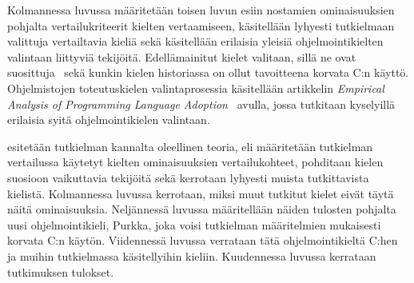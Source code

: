 Kolmannessa luvussa määritetään toisen luvun esiin nostamien ominaisuuksien
pohjalta vertailukriteerit kielten vertaamiseen, käsitellään lyhyesti
tutkielmaan valittuja vertailtavia kieliä sekä käsitellään erilaisia yleisiä
ohjelmointikielten valintaan liittyviä tekijöitä. Edellämainitut kielet
valitaan, sillä ne ovat suosittuja~\citep{tiobe} sekä kunkin kielen historiassa
on ollut tavoitteena korvata C:n käyttö. Ohjelmistojen toteutuskielen
valintaprosessia käsitellään artikkelin \emph{Empirical Analysis of Programming
Language Adoption}~\citep{empiricalpopularity} avulla, jossa tutkitaan
kyselyillä erilaisia syitä ohjelmointikielen valintaan.


esitetään tutkielman kannalta oleellinen
teoria, eli määritetään tutkielman vertailussa käytetyt kielten ominaisuuksien
vertailukohteet, pohditaan kielen suosioon vaikuttavia tekijöitä sekä kerrotaan
lyhyesti muista tutkittavista kielistä. Kolmannessa luvussa kerrotaan, miksi
muut tutkitut kielet eivät täytä näitä ominaisuuksia. Neljännessä luvussa
määritellään näiden tulosten pohjalta uusi ohjelmointikieli, Purkka, joka voisi
tutkielman määritelmien mukaisesti korvata C:n käytön. Viidennessä luvussa
verrataan tätä ohjelmointikieltä C:hen ja muihin tutkielmassa käsitellyihin
kieliin. Kuudennessa luvussa kerrataan tutkimuksen tulokset.

